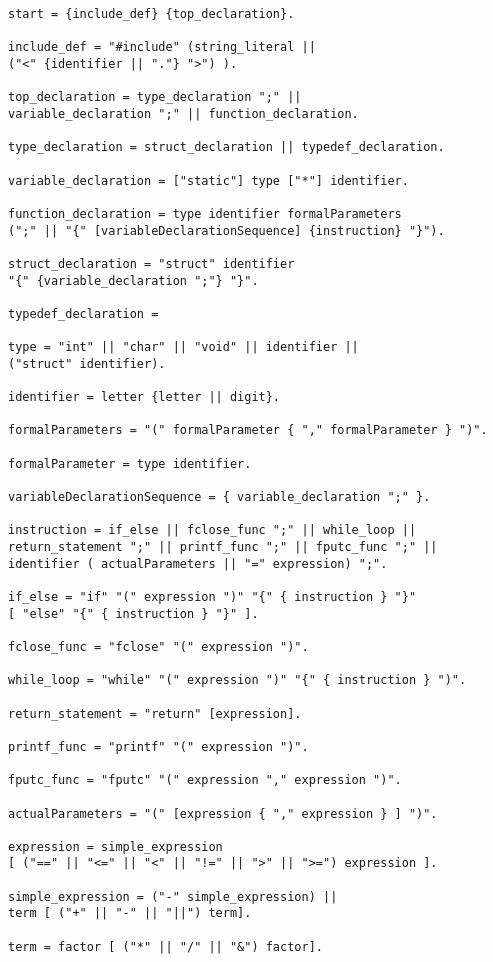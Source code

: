 \documentclass[a4paper,12pt]{article}
\begin{document}
	\begin{lstlisting}	
start = {include_def} {top_declaration}.

include_def = "#include" (string_literal ||
("<" {identifier || "."} ">") ).

top_declaration = type_declaration ";" ||
variable_declaration ";" || function_declaration.

type_declaration = struct_declaration || typedef_declaration.

variable_declaration = ["static"] type ["*"] identifier.

function_declaration = type identifier formalParameters
(";" || "{" [variableDeclarationSequence] {instruction} "}").

struct_declaration = "struct" identifier
"{" {variable_declaration ";"} "}".

typedef_declaration =

type = "int" || "char" || "void" || identifier || 
("struct" identifier).

identifier = letter {letter || digit}.

formalParameters = "(" formalParameter { "," formalParameter } ")".

formalParameter = type identifier.

variableDeclarationSequence = { variable_declaration ";" }.

instruction = if_else || fclose_func ";" || while_loop || 
return_statement ";" || printf_func ";" || fputc_func ";" ||
identifier ( actualParameters || "=" expression) ";".

if_else = "if" "(" expression ")" "{" { instruction } "}" 
[ "else" "{" { instruction } "}" ].

fclose_func = "fclose" "(" expression ")".

while_loop = "while" "(" expression ")" "{" { instruction } ")".

return_statement = "return" [expression].

printf_func = "printf" "(" expression ")".

fputc_func = "fputc" "(" expression "," expression ")".

actualParameters = "(" [expression { "," expression } ] ")".

expression = simple_expression 
[ ("==" || "<=" || "<" || "!=" || ">" || ">=") expression ].

simple_expression = ("-" simple_expression) ||
term [ ("+" || "-" || "||") term].

term = factor [ ("*" || "/" || "&") factor].


\end{lstlisting}
\end{document}
